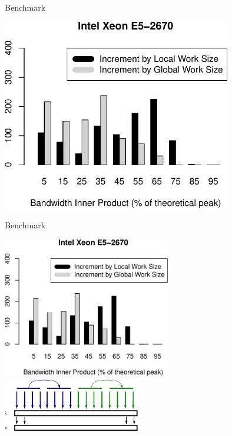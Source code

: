 \begin{frame}{Benchmark}
  \begin{center} \includegraphics[width=0.75\textwidth]{figures/xeon_cpu_double_hist_itertype_dot} \end{center}
\end{frame}

\begin{frame}{Benchmark}
  \begin{center} \includegraphics[width=0.55\textwidth]{figures/xeon_cpu_double_hist_itertype_dot} \\[1em]
                 \includegraphics[width=0.45\textwidth]{figures/copy-kernel-cpu-full} 
  \end{center}
\end{frame}




